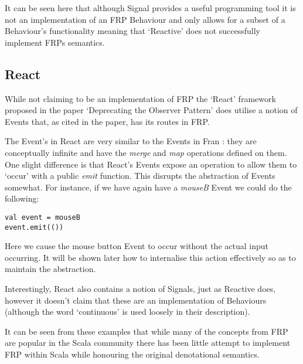       It can be seen here that although Signal provides a useful programming tool it is not an implementation
      of an FRP Behaviour and only allows for a subset of a Behaviour's functionality meaning that `Reactive'
      does not successfully implement FRPs semantics.
    
    \subsection{React}
      While not claiming to be an implementation of FRP the `React' framework proposed in the 
      paper `Deprecating the Observer Pattern' \cite{Maier2010} does utilise a notion of Events that, as cited in the paper,
      has its routes in FRP.
      
      The Event's in React are very similar to the Events in Fran \cite{Elliott1997}: they are conceptually infinite
      and have the \emph{merge} and \emph{map} operations defined on them. One slight difference is that React's
      Events expose an operation to allow them to `occur' with a public \emph{emit} function. This disrupts
      the abstraction of Events somewhat. For instance, if we have again have a \emph{mouseB} Event we could do the following:

\begin{verbatim}
val event = mouseB
event.emit(())
\end{verbatim}      
      
      Here we cause the mouse button Event to occur without the actual input occurring. It will be shown later how to     
      internalise this action effectively so as to maintain the abstraction. 
      
      Interestingly, React also contains a notion of Signals, just as Reactive does, 
      however it doesn't claim that these are an implementation of Behaviours (although the word `continuous' is
      used loosely in their description). 
      
  It can be seen from these examples that while many of the concepts from FRP are popular
  in the Scala community there has been little attempt to implement FRP within Scala while honouring
  the original denotational semantics.